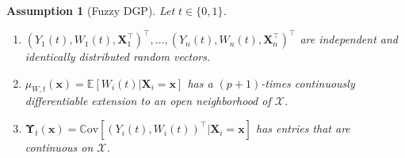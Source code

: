 \documentclass[10pt]{article}
\newtheorem{assumption}{Assumption}
\newcommand{\E}{\mathbb{E}}
\newcommand{\Cov}{\mathbb{C}\mathrm{ov}}
\newcommand{\bx}{\mathbf{x}}
\newcommand{\bX}{\mathbf{X}}
\newcommand{\bUpsilon}{\boldsymbol{\Upsilon}}
\newcommand{\X}{\mathcal{X}}
\begin{document}
\begin{assumption}[Fuzzy DGP]\label{sa-assump: Fuzzy DGP}
    Let $t\in\{0,1\}$.
    \begin{enumerate}[label=\normalfont(\roman*),noitemsep,leftmargin=*]

    \item $(Y_1(t), W_1(t), \bX_1^\top)^\top,\ldots, (Y_n(t), W_n(t), \bX_n^\top)^\top$ are independent and identically distributed random vectors.

    \item $\mu_{W,t}(\bx) = \E[W_i(t)| \bX_i = \bx]$ has a $(p+1)$-times continuously differentiable extension to an open neighborhood of $\X$.

    \item $\bUpsilon_{t}(\bx) = \Cov[(Y_i(t), W_i(t))^{\top}|\bX_i = \bx]$ has entries that are continuous on $\X$.

    \end{enumerate}
\end{assumption}
\end{document}
